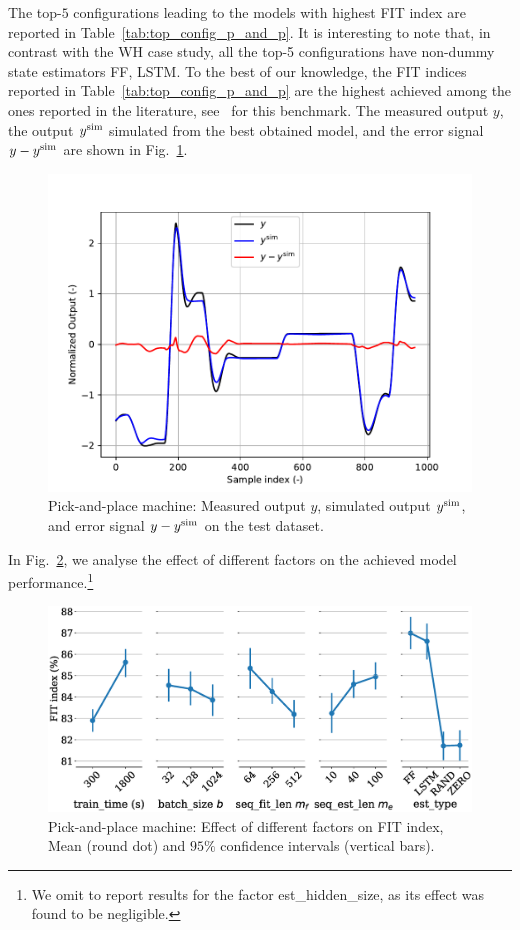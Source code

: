 \documentclass{article}
\begin{document}
The top-$5$ configurations leading to the models with highest FIT index are reported in Table~\ref{tab:top_config_p_and_p}. It is interesting to note that, in contrast with the WH case study, all the top-5 configurations have non-dummy state estimators FF, LSTM. 
{To the best of our knowledge, the FIT indices  reported in Table~\ref{tab:top_config_p_and_p} are the highest achieved among the ones reported in the literature, see~\cite{bemporad2005bounded, piga2020bayes, mattson18, mejari2020mixed, mazzoleni22}  for this benchmark.}    
The measured output $y$, the output $y^{\rm sim}$ simulated from the best obtained model, and the error signal $y - y^{\rm sim}$ are shown in Fig.~\ref{fig:pp_best_timetrace.pdf}. 
\begin{figure}
    \centering
    \includegraphics[width=.7\columnwidth]{figures/pp_best_timetrace.pdf}
    \caption{Pick-and-place machine: Measured output $y$, simulated output $y^{\rm sim}$, and error signal $y - y^{\rm sim}$ on the test dataset.}
    \label{fig:pp_best_timetrace.pdf}
\end{figure}

In Fig.~\ref{fig:fit_vs_fact_pnp}, we analyse the effect of different factors on the achieved model performance.\footnote{We omit to report results for the factor est\_hidden\_size, as its effect was found to be negligible.
} 
\begin{figure}
    \centering
    \includegraphics[width=.7\columnwidth]{figures/PP_fit_vs_factors.eps}
    \caption{Pick-and-place machine: Effect of different factors on FIT index,  Mean (round dot) and $95\%$ confidence intervals (vertical bars). }
    \label{fig:fit_vs_fact_pnp}
\end{figure}
\end{document}
